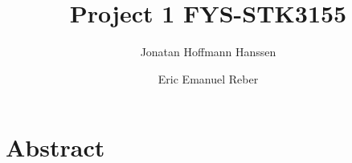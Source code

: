 \documentclass{article}
\author{Jonatan Hoffmann Hanssen \and Eric Emanuel Reber}
\title{Project 1 FYS-STK3155}
\begin{document}
	\maketitle

\section*{Abstract}
\end{document}
